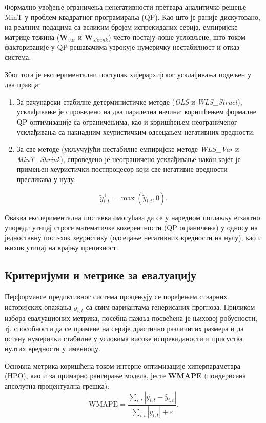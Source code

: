 \documentclass[12pt,oneside]{memoir}
\begin{document}
Формално увођење ограничења ненегативности претвара аналитичко решење MinT у проблем квадратног програмирања (QP). Као што је раније дискутовано, на реалним подацима са великим бројем испрекиданих серија, емпиријске матрице тежина ($\mathbf{W}_{var}$ и $\mathbf{W}_{shrink}$) често постају лоше условљене, што током факторизације у QP решавачима узрокује нумеричку нестабилност и отказ система. 

Због тога је експериментални поступак хијерархијског усклађивања подељен у два правца:
\begin{enumerate}
    \item За рачунарски стабилне детерминистичке методе (\textit{OLS} и \textit{WLS\_Struct}), усклађивање је спроведено на два паралелна начина: коришћењем формалне QP оптимизације са ограничењима, као и коришћењем неограниченог усклађивања са накнадним хеуристичким одсецањем негативних вредности.
    \item За све методе (укључујући нестабилне емпиријске методе \textit{WLS\_Var} и \textit{MinT\_Shrink}), спроведено је неограничено усклађивање након којег је примењен хеуристички постпроцесор који све негативне вредности пресликава у нулу:
\end{enumerate}

\begin{equation}
    \tilde{y}^{+}_{i,t} = \max(\tilde{y}_{i,t}, 0).
\end{equation}

Оваква експериментална поставка омогућава да се у наредном поглављу егзактно упореди утицај строге математичке кохерентности (QP ограничења) у односу на једноставну пост-хок хеуристику (одсецање негативних вредности на нулу), као и њихов утицај на крајњу прецизност.

\subsection{Критеријуми и метрике за евалуацију}

Перформансе предиктивног система процењују се поређењем стварних историјских опажања $y_{i,t}$ са свим варијантама генерисаних прогноза. Приликом избора евалуационих метрика, посебна пажња посвећена је њиховој робусности, тј. способности да се примене на серије драстично различитих размера и да остану нумерички стабилне у условима високе испрекиданости и присуства нултих вредности у имениоцу.

Основна метрика коришћена током интерне оптимизације хиперпараметара (HPO), као и за примарно рангирање модела, јесте \textbf{WMAPE} (пондерисана апсолутна процентуална грешка):
\begin{equation}
    \mathrm{WMAPE} = \frac{\sum_{i,t} |y_{i,t} - \hat{y}_{i,t}|}{\sum_{i,t} |y_{i,t}| + \varepsilon}.
\end{equation}
\end{document}
